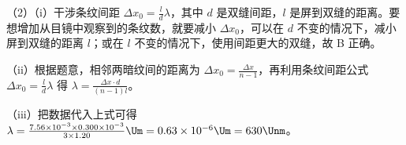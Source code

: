 \documentclass[\gkver]{gaokaozhenti}
\begin{document}
\begin{enumerate}
{（2）（i）干涉条纹间距 $\Delta x_0=\frac{l}{d}\lambda$，其中 $d$ 是双缝间距，$l$ 是屏到双缝的距离。要想增加从目镜中观察到的条纹数，就要减小 $\Delta x_0$，可以在 $d$ 不变的情况下，减小屏到双缝的距离 $l$；或在 $l$ 不变的情况下，使用间距更大的双缝，故 B 正确。

（ii）根据题意，相邻两暗纹间的距离为 $\Delta x_0=\frac{\Delta x}{n-1}$，再利用条纹间距公式 $\Delta x_0=\frac{l}{d}\lambda$ 得 $\lambda=\frac{\Delta x\cdot d}{(n-1)l}$。

（iii）把数据代入上式可得 $\lambda=\frac{7.56\times10^{-3}\times0.300\times10^{-3}}{3\times1.20}\Um=0.63\times10^{-6}\Um=630\Unm$。
}

\end{enumerate}
\end{document}
